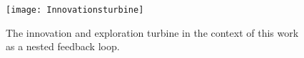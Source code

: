 \begin{figure}[h]
    \centering
    \texttt{[image: Innovationsturbine]}
    \caption{The innovation and exploration turbine in the context of this work as a nested feedback loop. \cite{adlakha-hutcheon_human_2022}}
    \label{fig:innovation_turbine}
\end{figure}



